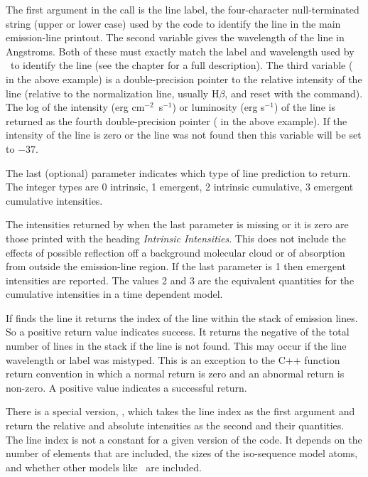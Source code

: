 The first argument in the call is the line label, the four-character
null-terminated string (upper or lower case) used by the code to identify
the line in the main emission-line printout.  The second variable gives
the wavelength of the line in Angstroms.  Both of these must exactly match
the label and wavelength used by \Cloudy\ to identify the line
(see the chapter  for a full description).
The third variable ( in the above
example) is a double-precision pointer to the relative intensity of the
line (relative to the normalization line, usually H$\beta$,
and reset with the
 command).
The log of the intensity (erg
cm$^{-2}$~s$^{-1}$) or luminosity
(erg s$^{-1}$) of the line is returned as the fourth double-precision pointer
( in the above example).
If the intensity of the line is zero or
the line was not found then this variable will be set to $-37$.

The last (optional) parameter indicates which type of line prediction to return.
The integer types are
 0 intrinsic, 
 1 emergent, 
 2 intrinsic cumulative, 
 3 emergent cumulative
 intensities.

The intensities returned by when the last parameter is missing
or it is zero are those printed with the
heading \emph{Intrinsic Intensities}.
This does not include the effects of possible
reflection off a background molecular cloud or of absorption from outside
the emission-line region.
If the last parameter is 1 then emergent
intensities are reported.
The values 2 and 3 are the equivalent quantities for the cumulative
intensities in a time dependent model.

If  finds the line it returns the index of the line within the
stack of emission lines.
So a positive return value indicates success.
It returns the negative of the total number of lines in the stack if the
line is not found.  This may occur if the line wavelength or label was
mistyped.  This is an exception to the C++ function return convention in
which a normal return is zero and an abnormal return is non-zero.  A positive
value indicates a successful return.

There is a special version, ,  which takes the line index as
the first argument and return the relative and absolute intensities as the
second and their quantities.  The line index is not a constant for a given
version of the code.  It depends on the number of elements that are included,
the sizes of the iso-sequence model atoms, and whether other models like
\htwo\ are included.

